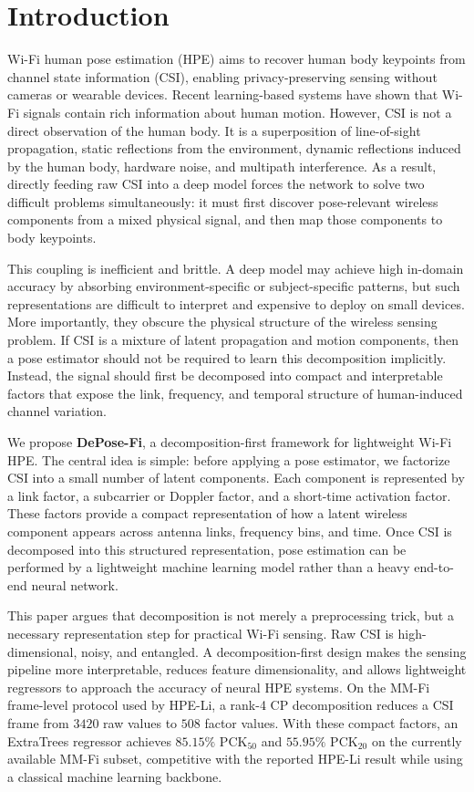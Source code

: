 \section{Introduction}

Wi-Fi human pose estimation (HPE) aims to recover human body keypoints from channel state information (CSI), enabling privacy-preserving sensing without cameras or wearable devices. Recent learning-based systems have shown that Wi-Fi signals contain rich information about human motion. However, CSI is not a direct observation of the human body. It is a superposition of line-of-sight propagation, static reflections from the environment, dynamic reflections induced by the human body, hardware noise, and multipath interference. As a result, directly feeding raw CSI into a deep model forces the network to solve two difficult problems simultaneously: it must first discover pose-relevant wireless components from a mixed physical signal, and then map those components to body keypoints.

This coupling is inefficient and brittle. A deep model may achieve high in-domain accuracy by absorbing environment-specific or subject-specific patterns, but such representations are difficult to interpret and expensive to deploy on small devices. More importantly, they obscure the physical structure of the wireless sensing problem. If CSI is a mixture of latent propagation and motion components, then a pose estimator should not be required to learn this decomposition implicitly. Instead, the signal should first be decomposed into compact and interpretable factors that expose the link, frequency, and temporal structure of human-induced channel variation.

We propose \textbf{DePose-Fi}, a decomposition-first framework for lightweight Wi-Fi HPE. The central idea is simple: before applying a pose estimator, we factorize CSI into a small number of latent components. Each component is represented by a link factor, a subcarrier or Doppler factor, and a short-time activation factor. These factors provide a compact representation of how a latent wireless component appears across antenna links, frequency bins, and time. Once CSI is decomposed into this structured representation, pose estimation can be performed by a lightweight machine learning model rather than a heavy end-to-end neural network.

This paper argues that decomposition is not merely a preprocessing trick, but a necessary representation step for practical Wi-Fi sensing. Raw CSI is high-dimensional, noisy, and entangled. A decomposition-first design makes the sensing pipeline more interpretable, reduces feature dimensionality, and allows lightweight regressors to approach the accuracy of neural HPE systems. On the MM-Fi frame-level protocol used by HPE-Li, a rank-4 CP decomposition reduces a CSI frame from $3420$ raw values to $508$ factor values. With these compact factors, an ExtraTrees regressor achieves $85.15\%$ PCK$_{50}$ and $55.95\%$ PCK$_{20}$ on the currently available MM-Fi subset, competitive with the reported HPE-Li result while using a classical machine learning backbone.

